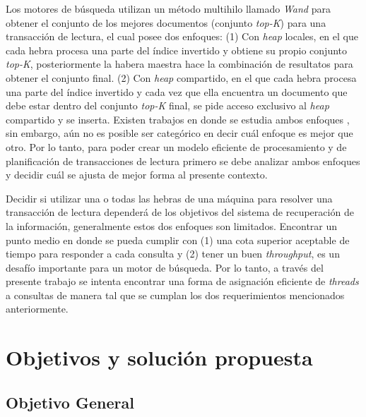 Los motores de búsqueda utilizan un método multihilo llamado \textit{Wand} para obtener el conjunto de los mejores documentos (conjunto \textit{top-K}) para una transacción de lectura, el cual posee dos enfoques: (1) Con \textit{heap} locales, en el que cada hebra procesa una parte del índice invertido y obtiene su propio conjunto \textit{top-K}, posteriormente la habera maestra hace la combinación de resultatos para obtener el conjunto final. (2) Con \textit{heap} compartido, en el que cada hebra procesa una parte del índice invertido y cada vez que ella encuentra un documento que debe estar dentro del conjunto \textit{top-K} final, se pide acceso exclusivo al \textit{heap} compartido y se inserta. Existen trabajos en donde se estudia ambos enfoques \citep{Rojas:2013}, sin embargo, aún no es posible ser categórico en decir cuál enfoque es mejor que otro. Por lo tanto, para poder crear un modelo eficiente de procesamiento y de planificación de transacciones de lectura primero se debe analizar ambos enfoques y decidir cuál se ajusta de mejor forma al presente contexto.

Decidir si utilizar una o todas las hebras de una máquina para resolver una transacción de lectura dependerá de los objetivos del sistema de recuperación de la información, generalmente estos dos enfoques son limitados. Encontrar un punto medio en donde se pueda cumplir con (1) una cota superior aceptable de tiempo para responder a cada consulta y (2) tener un buen \textit{throughput}, es un desafío importante para un motor de búsqueda. Por lo tanto, a través del presente trabajo se intenta encontrar una forma de asignación eficiente de \textit{threads} a consultas de manera tal que se cumplan los dos requerimientos mencionados anteriormente. 



\section{Objetivos y solución propuesta}
\label{intro:objetivosysolucion}






\subsection{Objetivo General}
\label{intro:objetivogeneral}



